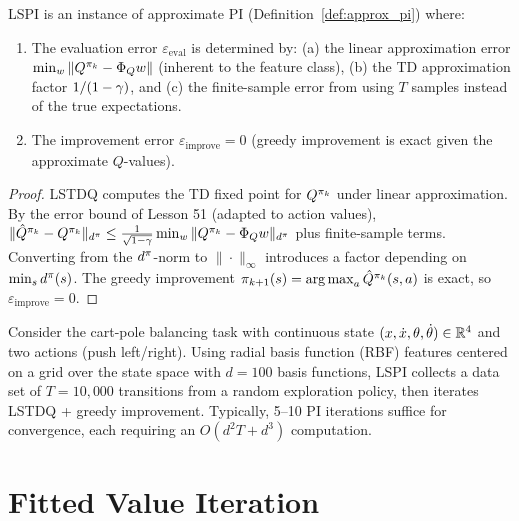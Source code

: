 \documentclass[11pt,a4paper]{article}
\begin{document}
\begin{proposition}
\label{prop:lspi_api}
LSPI is an instance of approximate PI (Definition~\ref{def:approx_pi})
where:
\begin{enumerate}
  \item The evaluation error $\varepsilon_{\mathrm{eval}}$ is
    determined by: (a) the linear approximation error
    $\min_w \|Q^{\pi_k} - \Phi_Q w\|$ (inherent to the feature
    class), (b) the TD approximation factor $1/(1-\gamma)$, and
    (c) the finite-sample error from using $T$ samples instead of
    the true expectations.
  \item The improvement error $\varepsilon_{\mathrm{improve}} = 0$
    (greedy improvement is exact given the approximate $Q$-values).
\end{enumerate}
\end{proposition}

\begin{proof}
LSTDQ computes the TD fixed point for $Q^{\pi_k}$ under
linear approximation. By the error bound of Lesson 51 (adapted to
action values), $\|\hat{Q}^{\pi_k} - Q^{\pi_k}\|_{d^\pi}
\leq \frac{1}{\sqrt{1-\gamma}}\min_w\|Q^{\pi_k}
- \Phi_Q w\|_{d^\pi}$ plus finite-sample terms. Converting
from the $d^\pi$-norm to $\|\cdot\|_\infty$ introduces a
factor depending on $\min_s d^\pi(s)$. The greedy improvement
$\pi_{k+1}(s) = \operatorname{arg\,max}_a \hat{Q}^{\pi_k}(s,a)$ is
exact, so $\varepsilon_{\mathrm{improve}} = 0$.
\end{proof}

\begin{example}
\label{ex:lspi}
Consider the cart-pole balancing task with continuous state
$(x, \dot{x}, \theta, \dot{\theta}) \in \mathbb{R}^4$ and two actions
(push left/right). Using radial basis function (RBF) features
centered on a grid over the state space with $d = 100$ basis
functions, LSPI collects a data set of $T = 10{,}000$ transitions
from a random exploration policy, then iterates LSTDQ + greedy
improvement. Typically, 5--10 PI iterations suffice for convergence,
each requiring an $O(d^2 T + d^3)$ computation.
\end{example}

\section{Fitted Value Iteration}
\label{sec:fvi}
\end{document}
